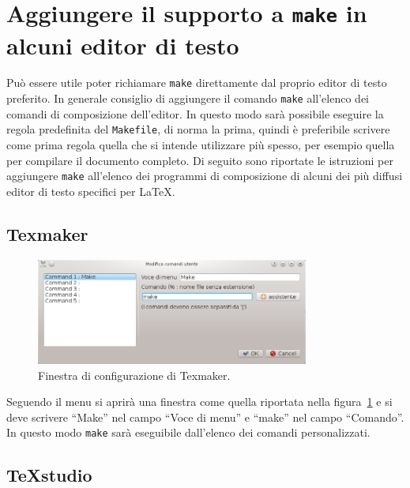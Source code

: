 \section{Aggiungere il supporto a \texttt{make} in alcuni editor di testo}
\label{sec:editor}

Può essere utile poter richiamare \texttt{make} direttamente dal proprio editor
di testo preferito.  In generale consiglio di aggiungere il comando
\texttt{make} all'elenco dei comandi di composizione dell'editor.  In questo
modo sarà possibile eseguire la regola predefinita del \texttt{Makefile}, di
norma la prima, quindi è preferibile scrivere come prima regola quella che si
intende utilizzare più spesso, per esempio quella per compilare il documento
completo.  Di seguito sono riportate le istruzioni per aggiungere \texttt{make}
all'elenco dei programmi di composizione di alcuni dei più diffusi editor di
testo specifici per \LaTeX{}.

\subsection{Texmaker}
\label{sec:texmaker}

\begin{figure}
  \centering
  \includegraphics[width=0.8\textwidth]{figure/texmaker}
  \caption{Finestra di configurazione di Texmaker.}
  \label{fig:texmaker}
\end{figure}
Seguendo il menu
 si aprirà una
finestra come quella riportata nella figura~\ref{fig:texmaker} e si deve
scrivere ``Make'' nel campo ``Voce di menu'' e ``make'' nel campo ``Comando''.
In questo modo \texttt{make} sarà eseguibile dall'elenco dei comandi
personalizzati.

\subsection{TeXstudio}
\label{sec:texstudio}

